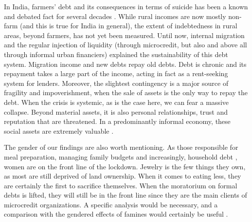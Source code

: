 \documentclass[a4paper, 11pt, onecolumn]{article}
\begin{document}
In India, farmers’ debt and its consequences in terms of suicide has been a known and debated fact for several decades \citep{Mohanty2005}. 
While rural incomes are now mostly non-farm (and this is true for India in general), the extent of indebtedness in rural areas, beyond farmers, has not yet been measured. 
Until now, internal migration and the regular injection of liquidity (through microcredit, but also and above all through informal urban financiers) explained the sustainability of this debt system. 
Migration income and new debts repay old debts. 
Debt is chronic and its repayment takes a large part of the income, acting in fact as a rent-seeking system for lenders. 
Moreover, the slightest contingency is a major source of fragility and impoverishment, when the sale of assets is the only way to repay the debt. 
When the crisis is systemic, as is the case here, we can fear a massive collapse. 
Beyond material assets, it is also personal relationships, trust and reputation that are threatened. 
In a predominantly informal economy, these social assets are extremely valuable \citep{Hart2000, Platteau1994}.

The gender of our findings are also worth mentioning. 
As those responsible for meal preparation, managing family budgets and increasingly, household debt \citep{Guerin2019}, women are on the front line of the lockdown. 
Jewelry is the few things they own, as most are still deprived of land ownership. 
When it comes to eating less, they are certainly the first to sacrifice themselves. 
When the moratorium on formal debts is lifted, they will still be in the front line since they are the main clients of microcredit organizations. 
A specific analysis would be necessary, and a comparison with the gendered effects of famines would certainly be useful \citep{Cliggett2005, Rangasami1986}. 
\end{document}
